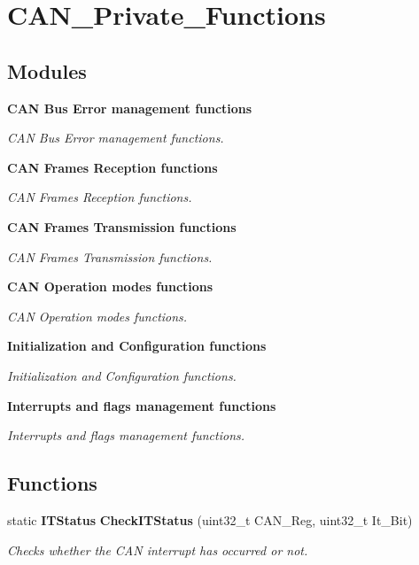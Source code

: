 \section{C\+A\+N\+\_\+\+Private\+\_\+\+Functions}
\label{group__CAN__Private__Functions}
\subsection*{Modules}
\begin{DoxyCompactItemize}
\item 
\textbf{ C\+A\+N Bus Error management functions}
\begin{DoxyCompactList}\small\item\em C\+AN Bus Error management functions. \end{DoxyCompactList}\item 
\textbf{ C\+A\+N Frames Reception functions}
\begin{DoxyCompactList}\small\item\em C\+AN Frames Reception functions. \end{DoxyCompactList}\item 
\textbf{ C\+A\+N Frames Transmission functions}
\begin{DoxyCompactList}\small\item\em C\+AN Frames Transmission functions. \end{DoxyCompactList}\item 
\textbf{ C\+A\+N Operation modes functions}
\begin{DoxyCompactList}\small\item\em C\+AN Operation modes functions. \end{DoxyCompactList}\item 
\textbf{ Initialization and Configuration functions}
\begin{DoxyCompactList}\small\item\em Initialization and Configuration functions. \end{DoxyCompactList}\item 
\textbf{ Interrupts and flags management functions}
\begin{DoxyCompactList}\small\item\em Interrupts and flags management functions. \end{DoxyCompactList}\end{DoxyCompactItemize}
\subsection*{Functions}
\begin{DoxyCompactItemize}
\item 
static \textbf{ I\+T\+Status} \textbf{ Check\+I\+T\+Status} (uint32\+\_\+t C\+A\+N\+\_\+\+Reg, uint32\+\_\+t It\+\_\+\+Bit)
\begin{DoxyCompactList}\small\item\em Checks whether the C\+AN interrupt has occurred or not. \end{DoxyCompactList}\end{DoxyCompactItemize}


